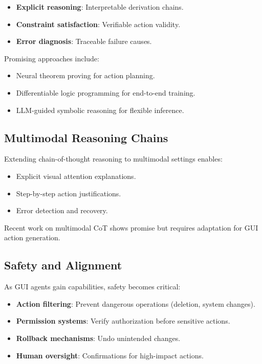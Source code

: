 \documentclass[11pt]{article}
\begin{document}
\begin{itemize}
    \item \textbf{Explicit reasoning}: Interpretable derivation chains.
    \item \textbf{Constraint satisfaction}: Verifiable action validity.
    \item \textbf{Error diagnosis}: Traceable failure causes.
\end{itemize}

Promising approaches include:

\begin{itemize}
    \item Neural theorem proving for action planning.
    \item Differentiable logic programming for end-to-end training.
    \item LLM-guided symbolic reasoning for flexible inference.
\end{itemize}

\subsection{Multimodal Reasoning Chains}

Extending chain-of-thought reasoning to multimodal settings enables:

\begin{itemize}
    \item Explicit visual attention explanations.
    \item Step-by-step action justifications.
    \item Error detection and recovery.
\end{itemize}

Recent work on multimodal CoT shows promise but requires adaptation for GUI action generation.

\subsection{Safety and Alignment}

As GUI agents gain capabilities, safety becomes critical:

\begin{itemize}
    \item \textbf{Action filtering}: Prevent dangerous operations (deletion, system changes).
    \item \textbf{Permission systems}: Verify authorization before sensitive actions.
    \item \textbf{Rollback mechanisms}: Undo unintended changes.
    \item \textbf{Human oversight}: Confirmations for high-impact actions.
\end{itemize}
\end{document}
